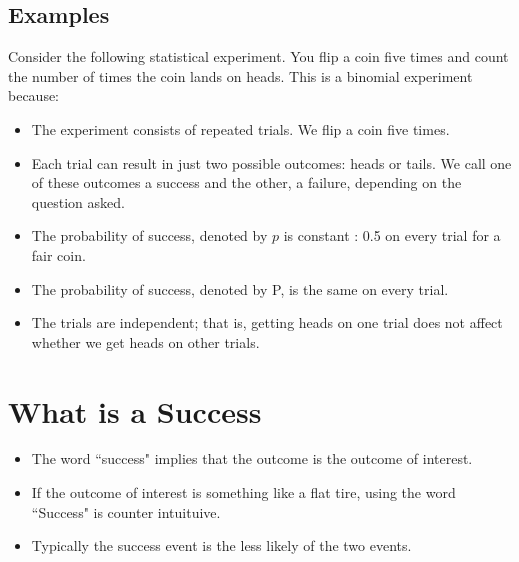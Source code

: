 \documentclass[]{report}
\begin{document}
\subsection*{Examples}
Consider the following statistical experiment. You flip a coin five times and count the number of times the coin lands on heads. This is a binomial experiment because:
\begin{itemize}
\item The experiment consists of repeated trials. We flip a coin five times.
\item Each trial can result in just two possible outcomes: heads or tails. We call one of these outcomes a success and the other, a failure, depending on the question asked.

\item The probability of success, denoted by $p$ is constant : 0.5 on every trial for a fair coin.
\item The probability of success, denoted by P, is the same on every trial.
\item The trials are independent; that is, getting heads on one trial does not affect whether we get heads on other trials.
\end{itemize}




\section*{What is a Success}
\begin{itemize}
\item
The word ``success" implies that the outcome is the outcome of interest.
\item If the outcome of interest is something like a flat tire, using the word ``Success" is counter intuituive.
\item Typically the success event is the less likely of the two events.
\end{itemize}

\end{document}
